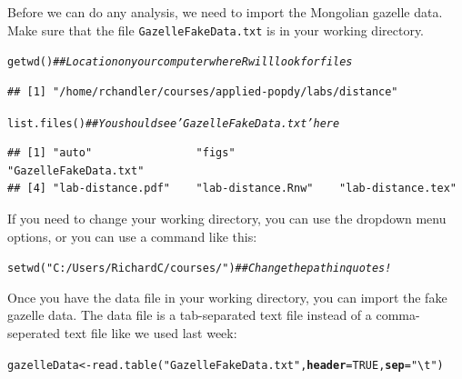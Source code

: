 \documentclass[12pt]{article}\usepackage[]{graphicx}\usepackage[]{color}
\makeatletter
\newcommand{\hlnum}[1]{\textcolor[rgb]{0.69,0.494,0}{#1}}%
\newcommand{\hlstr}[1]{\textcolor[rgb]{0.749,0.012,0.012}{#1}}%
\newcommand{\hlcom}[1]{\textcolor[rgb]{0.514,0.506,0.514}{\textit{#1}}}%
\newcommand{\hlstd}[1]{\textcolor[rgb]{0,0,0}{#1}}%
\newcommand{\hlkwb}[1]{\textcolor[rgb]{0,0.341,0.682}{#1}}%
\newcommand{\hlkwc}[1]{\textcolor[rgb]{0,0,0}{\textbf{#1}}}%
\newcommand{\hlkwd}[1]{\textcolor[rgb]{0.004,0.004,0.506}{#1}}%
\newenvironment{kframe}{%
 \def\at@end@of@kframe{}%
 \ifinner\ifhmode%
  \def\at@end@of@kframe{\end{minipage}}%
  \begin{minipage}{\columnwidth}%
 \fi\fi%
 \def\FrameCommand##1{\hskip\@totalleftmargin \hskip-\fboxsep
 \colorbox{shadecolor}{##1}\hskip-\fboxsep
     \hskip-\linewidth \hskip-\@totalleftmargin \hskip\columnwidth}%
 \MakeFramed {\advance\hsize-\width
   \@totalleftmargin\z@ \linewidth\hsize
   \@setminipage}}%
 {\par\unskip\endMakeFramed%
 \at@end@of@kframe}
\newenvironment{knitrout}{}{} %
\makeatother
\begin{document}
Before we can do any analysis, we need to import the Mongolian gazelle
data. Make sure that the file \texttt{GazelleFakeData.txt} is in your
working directory.

\begin{knitrout}
\color{fgcolor}\begin{kframe}
\begin{alltt}
\hlkwd{getwd}\hlstd{()}       \hlcom{## Location on your computer where R will look for files}
\end{alltt}
\begin{verbatim}
## [1] "/home/rchandler/courses/applied-popdy/labs/distance"
\end{verbatim}
\begin{alltt}
\hlkwd{list.files}\hlstd{()}  \hlcom{## You should see 'GazelleFakeData.txt' here}
\end{alltt}
\begin{verbatim}
## [1] "auto"                "figs"                "GazelleFakeData.txt"
## [4] "lab-distance.pdf"    "lab-distance.Rnw"    "lab-distance.tex"
\end{verbatim}
\end{kframe}
\end{knitrout}

If you need to change your working directory, you can use the dropdown
menu options, or you can use a command like this:

\begin{knitrout}
\color{fgcolor}\begin{kframe}
\begin{alltt}
\hlkwd{setwd}\hlstd{(}\hlstr{"C:/Users/RichardC/courses/"}\hlstd{)} \hlcom{## Change the path in quotes!}
\end{alltt}
\end{kframe}
\end{knitrout}

Once you have the data file in your working directory, you can import
the fake gazelle data. The data file is a tab-separated text file
instead of a comma-seperated text file like we used last week:

\begin{knitrout}
\color{fgcolor}\begin{kframe}
\begin{alltt}
\hlstd{gazelleData} \hlkwb{<-} \hlkwd{read.table}\hlstd{(}\hlstr{"GazelleFakeData.txt"}\hlstd{,} \hlkwc{header}\hlstd{=}\hlnum{TRUE}\hlstd{,} \hlkwc{sep}\hlstd{=}\hlstr{"\textbackslash{}t"}\hlstd{)}
\end{alltt}
\end{kframe}
\end{knitrout}
\end{document}
